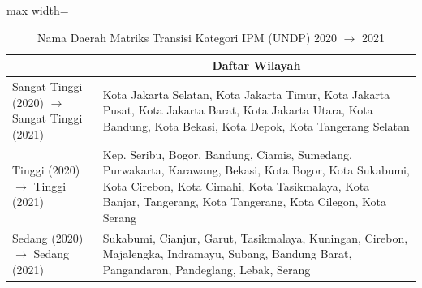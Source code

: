 \begin{table}[H]
\centering
\caption{Nama Daerah Matriks Transisi Kategori IPM (UNDP) 2020 \(\rightarrow\) 2021} \label{tab:app2ipmname2020x2021}
\begin{adjustbox}{max width=\textwidth}
\begin{tabular}{|>{\centering\arraybackslash}p{4cm}|p{10cm}|}
\hline
\multicolumn{1}{|c|}{\textbf{Kategori}} & \multicolumn{1}{c|}{\textbf{Daftar Wilayah}} \\
\hline
Sangat Tinggi (2020) \(\rightarrow\) Sangat Tinggi (2021) & Kota Jakarta Selatan, Kota Jakarta Timur, Kota Jakarta Pusat, Kota Jakarta Barat, Kota Jakarta Utara, Kota Bandung, Kota Bekasi, Kota Depok, Kota Tangerang Selatan \\
\hline
Tinggi (2020) \(\rightarrow\) Tinggi (2021) & Kep. Seribu, Bogor, Bandung, Ciamis, Sumedang, Purwakarta, Karawang, Bekasi, Kota Bogor, Kota Sukabumi, Kota Cirebon, Kota Cimahi, Kota Tasikmalaya, Kota Banjar, Tangerang, Kota Tangerang, Kota Cilegon, Kota Serang \\
\hline
Sedang (2020) \(\rightarrow\) Sedang (2021) & Sukabumi, Cianjur, Garut, Tasikmalaya, Kuningan, Cirebon, Majalengka, Indramayu, Subang, Bandung Barat, Pangandaran, Pandeglang, Lebak, Serang \\
\hline
\end{tabular}
\end{adjustbox}
\end{table}